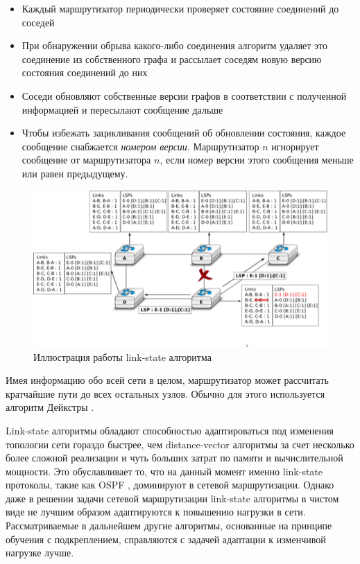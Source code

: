 \documentclass[specification,annotation,times]{itmo-student-thesis}
\theoremstyle{definition}
\begin{document}
\begin{itemize}
\item Каждый маршрутизатор периодически проверяет состояние соединений до
  соседей
\item При обнаружении обрыва какого-либо соединения алгоритм удаляет это
  соединение из собственного графа и рассылает соседям новую версию состояния
  соединений до них
\item Соседи обновляют собственные версии графов в соответствии с полученной
  информацией и пересылают сообщение дальше
\item Чтобы избежать зацикливания сообщений об обновлении состояния, каждое
  сообщение снабжается \textit{номером версии}. Маршрутизатор $n$ игнорирует
  сообщение от маршрутизатора $n$, если номер версии этого сообщения меньше или
  равен предыдущему.
\end{itemize}

\begin{figure}[!h]
  \caption{Иллюстрация работы link-state алгоритма}\label{ospf-img}
  \centering
  \includegraphics[scale=1.5]{ls-twoway}
\end{figure}

Имея информацию обо всей сети в целом, маршрутизатор может рассчитать кратчайшие
пути до всех остальных узлов. Обычно для этого используется алгоритм
Дейкстры \cite{dijkstra}. 

Link-state алгоритмы обладают способностью адаптироваться под изменения
топологии сети гораздо быстрее, чем distance-vector алгоритмы за счет
несколько более сложной реализации и чуть больших затрат по памяти и
вычислительной мощности. Это обуславливает то, что на данный момент именно
link-state протоколы, такие как OSPF \cite{ospf-rfc}, доминируют в сетевой
маршрутизации. Однако даже в решении задачи сетевой маршрутизации link-state
алгоритмы в чистом виде не лучшим образом адаптируются к повышению нагрузки в
сети. Рассматриваемые в дальнейшем другие алгоритмы, основанные на принципе
обучения с подкреплением, справляются с задачей адаптации к
изменчивой нагрузке лучше.
\end{document}
